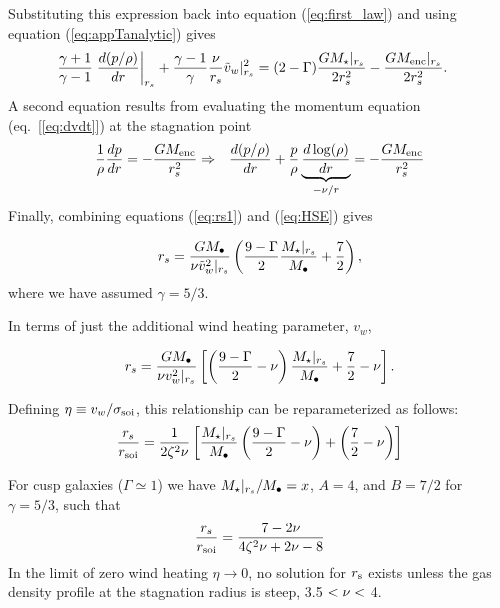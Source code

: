 Substituting this expression back into equation (\ref{eq:first_law}) and using equation (\ref{eq:appTanalytic}) gives
\begin{align}
&\frac{\gamma+1}{\gamma-1}
\left.\frac{d (p/\rho)}{d r}\right|_{r_s}+ \frac{\gamma-1}{\gamma} \frac{\nu}{r_s} \tilde{v}_{w}|_{r_s}^{2} = (2-\Gamma) \frac{G
  M_{\star}|_{r_s}}{2 r_s^2} -\frac{G M_{\rm enc}|_{r_s}}{2 r_s^2}.  \label{eq:rs1}
\end{align}
A second equation results from evaluating the momentum equation (eq.~[\ref{eq:dvdt}]) at the stagnation point
\begin{align}
&\frac{1}{\rho}\frac{d p}{d r}=- \frac{GM_{\rm enc}}{r_s^2} \Rightarrow
&\frac{d (p/\rho)}{d r}+\frac{p}{\rho}
\underbrace{\frac{d\log(\rho)}{dr}}_{-\nu/r} = -\frac{G M_{\rm enc}}{r_s^2} \label{eq:HSE}
\end{align}
Finally, combining equations (\ref{eq:rs1}) and (\ref{eq:HSE}) gives 

\begin{align}
r_s=\frac{G M_{\bullet}}{\nu \tilde{v}_{w}^{2}|_{r_s}}\left(\frac{9-\Gamma}{2}
  \frac{M_{\star}|_{r_s}}{M_{\bullet}} +\frac{7}{2}\right),
\end{align}
where we have assumed $\gamma=5/3$.

In terms of just the additional wind heating parameter, $v_w$,

\begin{align}
r_s=\frac{G M_{\bullet}}{\nu v_w^{2}|_{r_s}}\left[\left(\frac{9-\Gamma}{2} -\nu\right) \frac{M_{\star}|_{r_s}}{M_{\bullet}} +\frac{7}{2}-\nu\right].
\label{eq:rs2main}
\end{align}


Defining $\eta \equiv v_{w}/\sigma_{\rm soi}$, this relationship can be
reparameterized as follows:
\begin{align}
  \frac{r_s}{r_{\rm soi}}=\frac{1}{2 \zeta^2 \nu}\left[
    \frac{M_{\star}|_{r_s}}{M_{\bullet}}\left(\frac{9-\Gamma}{2}-\nu\right)+\left(\frac{7}{2}-\nu\right)\right]
\end{align}

For cusp galaxies ($\Gamma\simeq1$) we have $M_{\star}|_{r_s}/M_{\bullet}=x$, $A=4$, and $B=7/2$ for $\gamma = 5/3$, such that 
\begin{align}
\frac{r_s}{r_{\rm soi}}=\frac{7-2\nu}{4\zeta^2 \nu+2\nu-8}
\end{align}
In the limit of zero wind heating $\eta \rightarrow 0$, no solution
for $r_{\rm s}$ exists unless the gas density profile at the
stagnation radius is steep, 3.5 $<\nu<$ 4.

